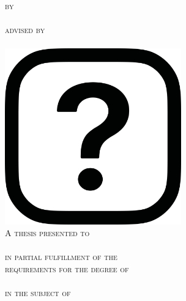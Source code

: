 \makeatletter
{
	\begin{titlepage}
		\begin{center}
			\hfill
			\vfill
			{\huge\bfseries\scshape\@title}\\[2ex]
			{\Large\@subtitle}\\[1em]

			{
			\scshape
			{by\\[1em]}
			{\bfseries\large\textsl{\@author}}\\[1em]

			{advised by\\[1em]}
			{\bfseries\large\textsl\advisorlist}\\[0.5in]

			\vfill
			\includegraphics[width=3in]{graphics/empty_diagram.png}\\[0.5in]
			\vfill
			{A thesis presented to \\[1em]}
			{\large\textsl{\@university}\\[1em]}
			in partial fulfillment of the\\
			requirements for the degree of\\[1em]

			{
			\large
			{\textsl\@degree}\\
			in the subject of
				{\textsl\@subject}\\[1em]
			}

			{\@location}\\
			{\@date}\\
			}
		\end{center}
	\end{titlepage}
}
\makeatother
\pagebreak
